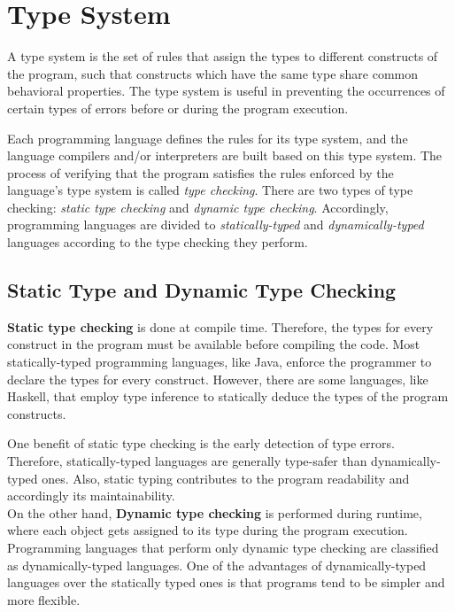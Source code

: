 \section{Type System}
A type system is the set of rules that assign the types to different constructs of the program, such that constructs which have the same type share common behavioral properties. The type system is useful in preventing the occurrences of certain types of errors before or during the program execution.

Each programming language defines the rules for its type system, and the language compilers and/or interpreters are built based on this type system. The process of verifying that the program satisfies the rules enforced by the language's type system is called \textit{type checking}. There are two types of type checking: \textit{static type checking} and \textit{dynamic type checking}. Accordingly, programming languages are divided to \textit{statically-typed} and \textit{dynamically-typed} languages according to the type checking they perform.

\subsection{Static Type and Dynamic Type Checking}

\textbf{Static type checking} is done at compile time. Therefore, the types for every construct in the program must be available before compiling the code. Most statically-typed programming languages, like Java, enforce the programmer to declare the types for every construct. However, there are some languages, like Haskell, that employ type inference to statically deduce the types of the program constructs.

One benefit of static type checking is the early detection of type errors. Therefore, statically-typed languages are generally type-safer than dynamically-typed ones. Also, static typing contributes to the program readability and accordingly its maintainability.\\

On the other hand, \textbf{Dynamic type checking} is performed during runtime, where each object gets assigned to its type during the program execution. Programming languages that perform only dynamic type checking are classified as dynamically-typed languages. One of the advantages of dynamically-typed languages over the statically typed ones is that programs tend to be simpler and more flexible.



